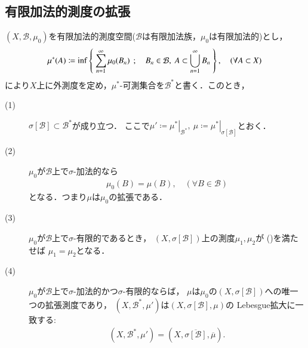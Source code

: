 	\subsection{有限加法的測度の拡張}
		\begin{screen}
			\begin{thm}
				$(X,\mathcal{B},\mu_0)$を有限加法的測度空間($\mathcal{B}$は有限加法族，$\mu_0$は有限加法的)とし，
				\begin{align}
					\mu^*(A) \coloneqq \operatorname*{inf}_{} \left\{\ \sum_{n=1}^\infty \mu_0(B_n)\ \, ; \quad B_n \in \mathcal{B},\ A \subset \bigcup_{n=1}^\infty B_n\ \right\},
					\quad (\forall A \subset X)
				\end{align}
				により$X$上に外測度を定め，$\mu^*$-可測集合を$\mathcal{B}^*$と書く．このとき，
				\begin{description}
					\item[(1)] $\sigma[\mathcal{B}] \subset \mathcal{B}^*$が成り立つ．
						ここで$\mu' \coloneqq\left.\mu^*\right|_{\mathcal{B}^*},
						\ \mu \coloneqq \left.\mu^*\right|_{\sigma[\mathcal{B}]}$とおく．
					\item[(2)] $\mu_0$が$\mathcal{B}$上で$\sigma$-加法的なら
						\begin{align}
							\mu_0(B) = \mu(B),\quad (\forall B \in \mathcal{B})
							\label{eq:appendix_finite_additive_measure_expansion_1}
						\end{align}
						となる．つまり$\mu$は$\mu_0$の拡張である．
						
					\item[(3)] $\mu_0$が$\mathcal{B}$上で$\sigma$-有限的であるとき，
						$\left( X,\sigma[\mathcal{B}] \right)$上の測度$\mu_1,\mu_2$が
						()を満たせば
						$\mu_1 = \mu_2$となる．
					
					\item[(4)] $\mu_0$が$\mathcal{B}$上で$\sigma$-加法的かつ$\sigma$-有限的ならば，
						$\mu$は$\mu_0$の$\left( X,\sigma[\mathcal{B}] \right)$への唯一つの拡張測度であり，
						$\left( X,\mathcal{B}^*,\mu' \right)$は$(X,\sigma[\mathcal{B}],\mu)$の
						Lebesgue拡大に一致する:
						\begin{align}
							\left( X,\mathcal{B}^*,\mu' \right) 
							= \left( X,\overline{\sigma[\mathcal{B}]},\overline{\mu} \right).
						\end{align}
				\end{description}
			\end{thm}
		\end{screen}
		
